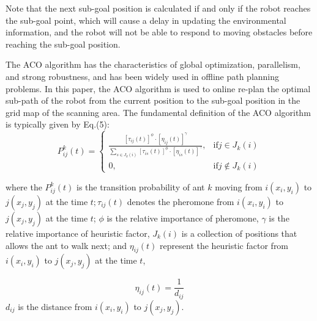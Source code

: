 \documentclass{iosart2c}
\begin{document}
Note that the next sub-goal position is calculated if and only if the robot reaches the sub-goal point, which will cause a delay in updating the environmental information, and the robot will not be able to respond to moving obstacles before reaching the sub-goal position. 

The ACO algorithm has the characteristics of global optimization, parallelism, and strong robustness, and has been widely used in offline path planning problems. In this paper, the ACO algorithm is used to online re-plan the optimal sub-path of the robot from the current position to the sub-goal position in the grid map of the scanning area. The fundamental definition of the ACO algorithm is typically given by Eq.(5):
\begin{equation} %
\!P_{ij}^{k}(t)\!=\left\{\begin{array}{ll}
\frac{\!\left[\tau_{i j}(t)\right]^{\phi}\! \cdot \!\left[\eta_{i j}(t)\right]^{\gamma}\!} {\!\sum\limits_{s \in J_{k}(i)} \left[\tau_{i s}(t)\right]^{\phi} \cdot \left[\eta_{i s}(t)\right]^{\gamma}\!}, &  \text {if} j \in \!J_{k}(i)\! \\
0, & \text {if} j \notin \!J_{k}(i)\!
\end{array}\right.
\end{equation}

where the ${P}_{i j}^{k}(t)$ is the transition probability of ant $k$ moving from $i(x_{i}, y_{i})$ to $j(x_{j}, y_{j})$ at the time $t ; \tau_{i j}(t)$ denotes the pheromone from $i(x_{i}, y_{i})$ to $j(x_{j}, y_{j})$ at the time $t$; $\phi$ is the relative importance of pheromone, $\gamma$ is the relative importance of heuristic factor, $J_{k}(i)$ is a collection of positions that allows the ant to walk next; and $\eta_{i j}(t)$ represent the heuristic factor from $i(x_{i}, y_{i})$ to $j(x_{j}, y_{j})$ at the time $t$,

\begin{equation} %
\eta_{i j}(t)=\frac{1}{d_{i j}}
\end{equation}
$d_{i j}$ is the distance from $i(x_{i}, y_{i})$ to $j(x_{j}, y_{j})$.
\end{document}
